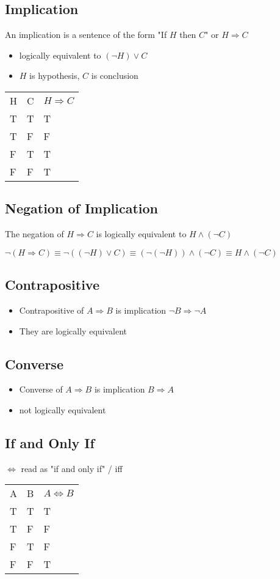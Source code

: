 \documentclass[12pt, letterpaper]{article}
\begin{document}
\subsection{Implication}
An implication is a sentence of the form "If $H$ then $C$" or $H \Rightarrow C$
\begin{itemize}
    \item logically equivalent to $(\neg H) \vee C$
    \item $H$ is hypothesis, $C$ is conclusion 
\end{itemize}
\begin{center}
\begin{tabular}{|l|l|l|}
    H  &C  &$H \Rightarrow C$ \\
    T  &T  &T \\
    T  &F  &F \\
    F  &T  &T \\
    F  &F  &T \\
\end{tabular}
\end{center}
\subsection{Negation of Implication}
The negation of $H \Rightarrow C$ is logically equivalent to $H \wedge (\neg C)$ \par 
$\neg(H \Rightarrow C) \equiv \neg((\neg H) \vee C) \equiv (\neg(\neg H)) \wedge (\neg C) \equiv H \wedge (\neg C)$
\subsection{Contrapositive}
\begin{itemize}
    \item Contrapositive of $A \Rightarrow B$ is implication $\neg B \Rightarrow \neg A$
    \item They are logically equivalent
\end{itemize}
\subsection{Converse}
\begin{itemize}
    \item Converse of $A \Rightarrow B$ is implication $B \Rightarrow A$
    \item not logically equivalent
\end{itemize}
\subsection{If and Only If}
$\iff$ read as "if and only if" / iff
\begin{center}
\begin{tabular}{|l|l|l|}
    A  &B  &$A \iff B$ \\
    T  &T  &T \\
    T  &F  &F \\
    F  &T  &F \\
    F  &F  &T 
\end{tabular}
\end{center}
\end{document}
